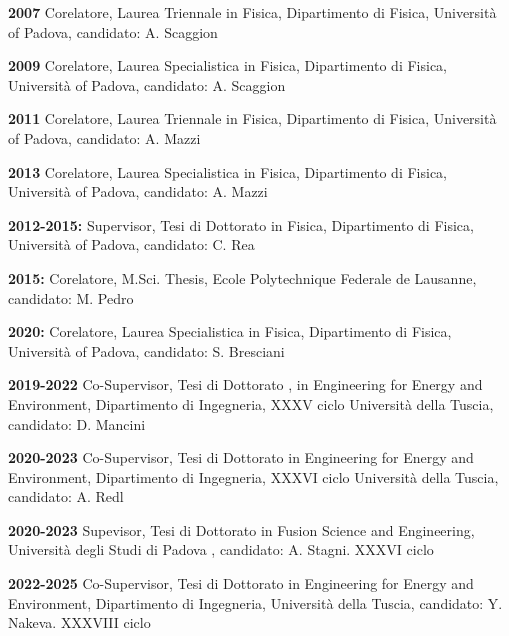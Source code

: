\begin{enumerate}[label={[I\arabic*]}]

\item \textbf{2007} Corelatore,  Laurea Triennale in Fisica, Dipartimento di
  Fisica,
  Universit{\`a} of Padova, candidato: A. Scaggion

\item \textbf{2009} Corelatore,  Laurea Specialistica in Fisica, Dipartimento di
  Fisica,
  Universit{\`a} of Padova, candidato: A. Scaggion

\item \textbf{2011} Corelatore,  Laurea Triennale in Fisica, Dipartimento di
  Fisica,
  Universit{\`a} of Padova, candidato: A. Mazzi

\item \textbf{2013} Corelatore,  Laurea Specialistica in Fisica, Dipartimento di
  Fisica,
  Universit{\`a} of Padova, candidato: A. Mazzi
    
\item \textbf{2012-2015:} Supervisor, Tesi di Dottorato in Fisica, Dipartimento di
  Fisica,
  Universit{\`a} of Padova, candidato: C. Rea

\item \textbf{2015:} Corelatore,  M.Sci. Thesis, Ecole Polytechnique
  Federale de Lausanne, candidato: M. Pedro

\item \textbf{2020:} Corelatore,  Laurea Specialistica in Fisica, Dipartimento di
  Fisica,
  Universit{\`a} of Padova, candidato: S. Bresciani

\item \textbf{2019-2022} Co-Supervisor, Tesi di Dottorato ,
  in Engineering for Energy and Environment, Dipartimento di
  Ingegneria, XXXV ciclo
  Universit{\`a} della Tuscia, candidato: D. Mancini

\item \textbf{2020-2023} Co-Supervisor, Tesi di Dottorato in Engineering for Energy and Environment, Dipartimento di
  Ingegneria, XXXVI ciclo
  Universit{\`a} della Tuscia, candidato: A. Redl

\item \textbf{2020-2023} Supevisor, Tesi di Dottorato in Fusion Science and
  Engineering,
  Universit{\`a} degli Studi di Padova , candidato: A. Stagni. XXXVI ciclo

\item \textbf{2022-2025} Co-Supervisor, Tesi di Dottorato in Engineering for Energy and Environment, Dipartimento di
  Ingegneria,
  Universit{\`a} della Tuscia, candidato: Y. Nakeva. XXXVIII ciclo
\end{enumerate}

